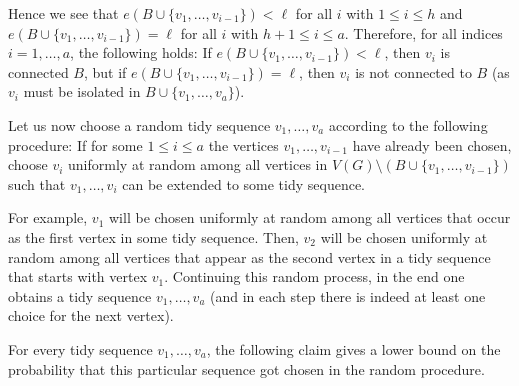 Hence we see that $e(B\cup \lbrace v_1,\dots,v_{i-1}\rbrace)<\ell$ for all $i$ with $1\leq i\leq h$ and $e(B\cup \lbrace v_1,\dots,v_{i-1}\rbrace)=\ell$ for all $i$ with $h+1\leq i\leq a$. Therefore, for all indices $i=1,\dots,a$, the following holds: If $e(B\cup \lbrace v_1,\dots,v_{i-1}\rbrace)<\ell$, then $v_i$ is connected $B$, but if $e(B\cup \lbrace v_1,\dots,v_{i-1}\rbrace)=\ell$, then $v_i$ is not connected to $B$ (as $v_i$ must be isolated in $B\cup \lbrace v_1,\dots,v_a\rbrace$).

Let us now choose a random tidy sequence $v_1,\dots,v_a$ according to the following procedure: If for some $1\leq i\leq a$ the vertices $v_1,\dots, v_{i-1}$ have already been chosen, choose $v_{i}$ uniformly at random among all vertices in $V(G)\setminus (B\cup \lbrace v_1,\dots, v_{i-1}\rbrace)$ such that $v_1,\dots, v_{i}$ can be extended to some tidy sequence.

For example, $v_1$ will be chosen uniformly at random among all vertices that occur as the first vertex in some tidy sequence. Then, $v_2$ will be chosen uniformly at random among all vertices that appear as the second vertex in a tidy sequence that starts with vertex $v_1$. Continuing this random process, in the end one obtains a tidy sequence $v_1,\dots,v_a$ (and in each step there is indeed at least one choice for the next vertex).

For every tidy sequence $v_1,\dots,v_a$, the following claim gives a lower bound on the probability that this particular sequence got chosen in the random procedure.


